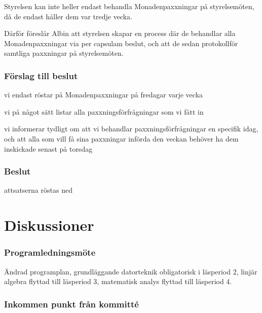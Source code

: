 \documentclass[protokoll]{dvd}
\begin{document}
Styrelsen kan inte heller endast behandla Monadenpaxxningar på styrelsemöten, då de endast håller dem var tredje vecka.

Därför föreslår Albin att styrelsen skapar en process där de behandlar alla Monadenpaxxningar via per capsulam beslut, och att de sedan protokollför samtliga paxxningar på styrelsemöten.


\subsubsection*{Förslag till beslut}

\begin{attsatser}
    \item vi endast röstar på Monadenpaxxningar på fredagar varje vecka
    \item vi på något sätt listar alla paxxningsförfrågningar som vi fått in 
    \item vi informerar tydligt om att vi behandlar paxxningsförfrågningar en specifik idag, och att alla som vill få sina paxxningar införda den veckan behöver ha dem inskickade senast på torsdag
\end{attsatser}


\subsubsection*{Beslut}
\begin{attsatser}
    \item attsatserna röstas ned 
\end{attsatser}






\section{Diskussioner}\label{sec:discussioner}


\subsubsection{Programledningsmöte}
Ändrad programplan, grundläggande datorteknik obligatorisk i läsperiod 2, linjär algebra flyttad till läsperiod 3, matematisk analys flyttad till läsperiod 4.


\subsubsection{Inkommen punkt från kommitté}
\end{document}
